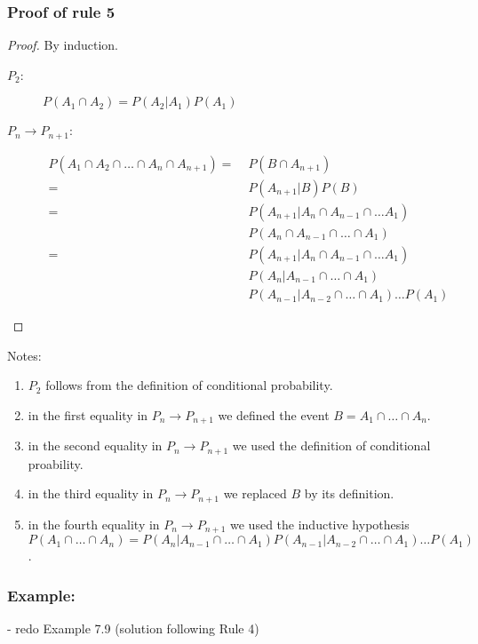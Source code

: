 \begin{frame}
    \frametitle{Proof of rule 5}

    \tiny
    \begin{proof}
        By induction.

        \begin{description}
            \item[$P_2$:] $P(A_1\cap A_2)=P(A_2|A_1)P(A_1)$
            \item[$P_n\rightarrow P_{n+1}$:]
                \begin{align*}
                    P(A_1\cap A_2\cap\ldots\cap A_n\cap A_{n+1})=\;&P(B\cap A_{n+1})\\
                    =\;&P(A_{n+1}|B)P(B)\\
                    =\;&P(A_{n+1}|A_n\cap A_{n-1}\cap\ldots A_1)\\
                       &P(A_n\cap A_{n-1}\cap\ldots\cap A_1)\\
                    =\;&P(A_{n+1}|A_n\cap A_{n-1}\cap\ldots A_1)\\
                       &P(A_n|A_{n-1}\cap\ldots\cap A_1)\\
                       &P(A_{n-1}|A_{n-2}\cap\ldots\cap A_1)\ldots P(A_1)
                \end{align*}
        \end{description}
    \end{proof}
    Notes:
    \begin{enumerate}
        \item $P_2$ follows from the definition of conditional probability.
        \item in the first equality in $P_n\rightarrow P_{n+1}$ we defined the
            event $B=A_1\cap\ldots\cap A_n$.
        \item in the second equality in $P_n\rightarrow P_{n+1}$ we used the
            definition of conditional proability.
        \item in the third equality in $P_n\rightarrow P_{n+1}$ we replaced $B$
            by its definition.
        \item in the fourth equality in $P_n\rightarrow P_{n+1}$ we used the
            inductive hypothesis $P(A_1\cap\ldots\cap A_n) =
            P(A_n|A_{n-1}\cap\ldots\cap A_1)P(A_{n-1}|A_{n-2}\cap\ldots\cap
            A_1)\ldots P(A_1)$.
    \end{enumerate}
\end{frame}

\begin{frame}
    \frametitle{Example:}

    - redo Example 7.9 (solution following Rule 4)

\end{frame}

